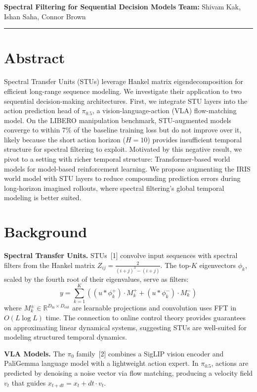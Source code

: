 \documentclass[10pt, letterpaper]{article}
\begin{document}
{\large \textbf{Spectral Filtering for Sequential Decision Models}} \hfill \textbf{Team:} Shivam Kak, Ishan Saha, Connor Brown \\
\rule{\textwidth}{0.4pt}

\section*{Abstract}

Spectral Transfer Units (STUs) leverage Hankel matrix eigendecomposition for efficient long-range sequence modeling. We investigate their application to two sequential decision-making architectures. First, we integrate STU layers into the action prediction head of $\pi_{0.5}$, a vision-language-action (VLA) flow-matching model. On the LIBERO manipulation benchmark, STU-augmented models converge to within 7\% of the baseline training loss but do not improve over it, likely because the short action horizon ($H{=}10$) provides insufficient temporal structure for spectral filtering to exploit. Motivated by this negative result, we pivot to a setting with richer temporal structure: Transformer-based world models for model-based reinforcement learning. We propose augmenting the IRIS world model with STU layers to reduce compounding prediction errors during long-horizon imagined rollouts, where spectral filtering's global temporal modeling is better suited.

\section*{Background}

\textbf{Spectral Transfer Units.}
STUs~[1] convolve input sequences with spectral filters from the Hankel matrix $Z_{ij} = \frac{2}{(i+j)^3 - (i+j)}$. The top-$K$ eigenvectors $\phi_k$, scaled by the fourth root of their eigenvalues, serve as filters:
\begin{equation}
y = \textstyle\sum_{k=1}^{K} \left( (u * \phi_k^+) \cdot M_k^+ + (u * \phi_k^-) \cdot M_k^- \right)
\end{equation}
where $M_k^{\pm} \in \mathbb{R}^{D_{\text{in}} \times D_{\text{out}}}$ are learnable projections and convolution uses FFT in $O(L \log L)$ time. The connection to online control theory provides guarantees on approximating linear dynamical systems, suggesting STUs are well-suited for modeling structured temporal dynamics.

\textbf{VLA Models.}
The $\pi_0$ family~[2] combines a SigLIP vision encoder and PaliGemma language model with a lightweight action expert. In $\pi_{0.5}$, actions are predicted by denoising a noise vector via flow matching, producing a velocity field $v_t$ that guides $x_{t+dt} = x_t + dt \cdot v_t$.
\end{document}
